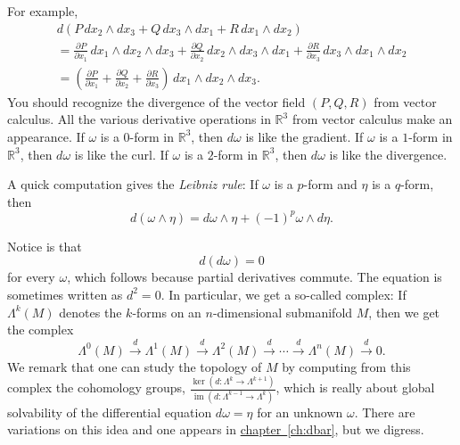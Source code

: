 \documentclass[12pt,openany]{book}
\newcommand{\R}{{\mathbb{R}}}
\newcommand{\myindex}[1]{#1\index{#1}}
\theoremstyle{plain}
\theoremstyle{remark}
\theoremstyle{definition}
\theoremstyle{exercise}
\theoremstyle{example}
\newcommand{\chapterref}[1]{\hyperref[#1]{chapter~\ref*{#1}}}
\begin{document}
For example,
\begin{multline*}
d \left(
P \, dx_2 \wedge dx_3
+
Q \, dx_3 \wedge dx_1
+
R \, dx_1 \wedge dx_2
\right)
\\
=
\frac{\partial P}{\partial x_1} \, dx_1 \wedge dx_2 \wedge dx_3
+
\frac{\partial Q}{\partial x_2} \, dx_2 \wedge dx_3 \wedge dx_1
+
\frac{\partial R}{\partial x_3} \, dx_3 \wedge dx_1 \wedge dx_2
\\
=
\left(
\frac{\partial P}{\partial x_1}
+
\frac{\partial Q}{\partial x_2}
+
\frac{\partial R}{\partial x_3}
\right) \, dx_1 \wedge dx_2 \wedge dx_3 .
\end{multline*}
You should recognize the divergence of the vector field $(P,Q,R)$ from vector
calculus.
All the various derivative operations in $\R^3$ from vector calculus make an
appearance.
If $\omega$ is a $0$-form in $\R^3$, then $d\omega$ is like the gradient.
If $\omega$ is a $1$-form in $\R^3$, then $d\omega$ is like the curl.
If $\omega$ is a $2$-form in $\R^3$, then $d\omega$ is like the divergence.

A quick computation gives the \emph{\myindex{Leibniz rule}}:
If $\omega$ is a $p$-form and $\eta$ is a $q$-form, then
\begin{equation*}
d(\omega \wedge \eta) = 
d\omega \wedge \eta + {(-1)}^p \omega \wedge d\eta .
\end{equation*}


\medskip

Notice is that
\begin{equation*}
d(d\omega) = 0
\end{equation*}
for every $\omega$,
which follows because partial derivatives commute.
The equation is sometimes written as $d^2=0$.  In particular, we get a
so-called complex:  If
$\Lambda^k(M)$ denotes the $k$-forms on an $n$-dimensional submanifold $M$,
then we get the complex
\begin{equation*}
\Lambda^0(M)
\overset{d}{\to}
\Lambda^1(M)
\overset{d}{\to}
\Lambda^2(M)
\overset{d}{\to}
\cdots
\overset{d}{\to}
\Lambda^n(M)
\overset{d}{\to}
0 .
\end{equation*}
We remark that one can study the topology of $M$
by computing from this complex the cohomology groups,
$\frac{\operatorname{ker}(d \colon \Lambda^k
\to \Lambda^{k+1})}{\operatorname{im}(d \colon \Lambda^{k-1} \to \Lambda^k)}$,
which is really about global solvability of the differential
equation $d\omega = \eta$ for an unknown $\omega$.  There are variations
on this idea and one appears in \chapterref{ch:dbar}, but we digress.
\end{document}
